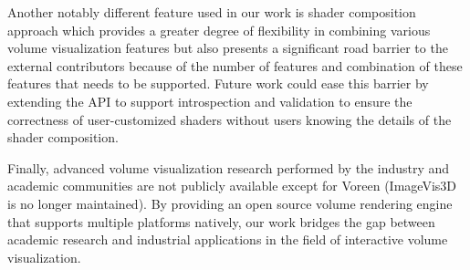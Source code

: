 Another notably different feature used in our work is shader composition approach
which provides a greater degree of flexibility in combining various volume
visualization features but also presents a significant road barrier to the external
contributors because of the number of features and combination of these features
that needs to be supported. Future work could ease this barrier by extending the
API to support introspection and validation to ensure the correctness of
user-customized shaders without users knowing the details of the shader composition.

Finally, advanced volume visualization research performed by the
industry and academic communities are not publicly available except for Voreen
(ImageVis3D is no longer maintained). By providing an open source volume rendering engine that supports multiple
platforms natively, our work bridges the gap between academic research and industrial
applications in the field of interactive volume visualization.
